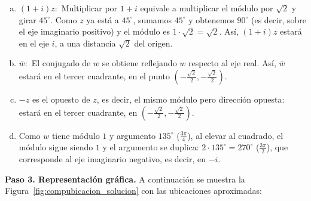\begin{prob}
\begin{myproof}
\begin{enumerate}[a)]
\item $(1+i)z:$ Multiplicar por $1+i$ equivale a multiplicar el módulo por $\sqrt{2}$ y girar $45^\circ$. Como $z$ ya está a $45^\circ$, sumamos $45^\circ$ y obtenemos $90^\circ$ (es decir, sobre el eje imaginario positivo) y el módulo es $1 \cdot \sqrt{2} = \sqrt{2}$. Así, $(1+i)z$ estará en el eje $i$, a una distancia $\sqrt{2}$ del origen.

\item $\overline{w}:$ El conjugado de $w$ se obtiene reflejando $w$ respecto al eje real. Así, $\overline{w}$ estará en el tercer cuadrante, en el punto $(-\frac{\sqrt{2}}{2}, -\frac{\sqrt{2}}{2})$.

\item $-z$ es el opuesto de $z$, es decir, el mismo módulo pero dirección opuesta: estará en el tercer cuadrante, en $(-\frac{\sqrt{2}}{2}, -\frac{\sqrt{2}}{2})$.

\item Como $w$ tiene módulo $1$ y argumento $135^\circ$ ($\frac{3\pi}{4}$), al elevar al cuadrado, el módulo sigue siendo $1$ y el argumento se duplica: $2 \cdot 135^\circ = 270^\circ$ ($\frac{3\pi}{2}$), que corresponde al eje imaginario negativo, es decir, en $-i$.
\end{enumerate}

\textbf{Paso 3. Representación gráfica.} A continuación se muestra la Figura~\ref{fig:compubicacion_solucion} con las ubicaciones aproximadas:

\begin{figure}[H]
\centering
{}
\end{figure}
\end{myproof}
\end{prob}

